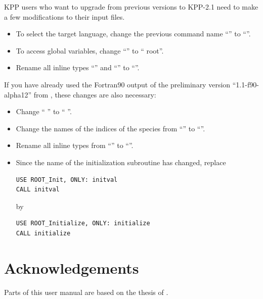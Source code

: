 \documentclass[twoside]{article}
\newcommand{\kpproot}{{\sc root}}
\begin{document}
KPP users who want to upgrade from previous versions to KPP-2.1 need to
make a few modifications to their input files.

\begin{itemize}
\item To select the target language, change the previous command name
  ``'' to ``''.
\item To access global variables, change ``'' to
  `` \kpproot{}''.
\item Rename all inline types ``'' and ``'' to
  ``''.
\end{itemize}

If you have already used the Fortran90 output of the preliminary version
``1.1-f90-alpha12'' from \citet{1666}, these changes are also necessary:

\begin{itemize}
\item Change `` '' to ``
  ''.
\item Change the names of the indices of the species from
  ``'' to ``''.
\item Rename all inline types from ``'' to ``''.
\item Since the name of the initialization subroutine has changed,
  replace
\begin{verbatim}
USE ROOT_Init, ONLY: initval
CALL initval
\end{verbatim}
  by
\begin{verbatim}
USE ROOT_Initialize, ONLY: initialize
CALL initialize
\end{verbatim}
\end{itemize}

\section{Acknowledgements}

Parts of this user manual are based on the thesis of \citet{1693}.

\end{document}
